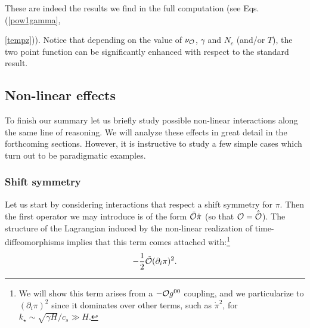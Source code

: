 \documentclass[11pt,amsmath,floats,floatfix,nofootinbib,secnumarabic, superscriptaddress, tightenlines]{revtex4}
\newcommand{\beq}{\begin{equation}}
\newcommand{\eeq}{\end{equation}}
\newcommand{\calo}{{\cal O}}
\begin{document}
These are indeed the results we find in the full computation (see Eqs. (\ref{pow1gamma},~{\ref{tempz})). Notice that depending on the value of $\nu_\calo$, $\gamma$ and $N_c$ (and/or $T$), the two point function can be significantly enhanced with respect to the standard result.

\subsection{Non-linear effects}\label{nonlineff}

To finish our summary let us briefly study possible non-linear interactions along the same line of reasoning. We will analyze these effects
 in great detail in the forthcoming sections. However, it is instructive to study a few simple cases which turn out to be paradigmatic examples.

\subsubsection{Shift symmetry}\label{shsym}

Let us start by considering interactions that respect a shift symmetry for $\pi$. Then the first operator we may introduce is
of the form $\tilde\calo\dot\pi$ (so that $\calo=\dot{\tilde\calo}$). The structure of the Lagrangian induced by the non-linear realization of  time-diffeomorphisms implies that this term comes attached with:\footnote{We will show this term arises from a $-\calo g^{00}$ coupling, and we particularize to $(\partial_i\pi)^2$ since it dominates over other terms, such as $\dot\pi^2$, for $k_\star \sim \sqrt{\gamma H} /c_s\gg H$.}
\beq
\label{dipi}
-\frac{1}{2}\tilde\calo (\partial_i \pi)^2.
\eeq

}
\end{document}
